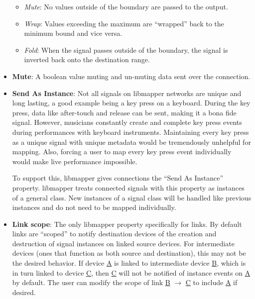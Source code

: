 \begin{itemize}
\begin{itemize}
		\item\emph{Mute}: No values outside of the boundary are passed to the output.
		\item\emph{Wrap}: Values exceeding the maximum are ``wrapped'' back to the minimum bound and vice versa.
		\item\emph{Fold}: When the signal passes outside of the boundary, the signal is inverted back onto the destination range. 
	\end{itemize}
	\item\textbf{Mute}: A boolean value muting and un-muting data sent over the connection.
	\item\textbf{Send As Instance}: Not all signals on libmapper networks are unique and long lasting, a good example being a key press on a keyboard. During the key press, data like after-touch and release can be sent, making it a bona fide signal. However, musicians constantly create and complete key press events during performances with keyboard instruments. Maintaining every key press as a unique signal with unique metadata would be tremendously unhelpful for mapping. Also, forcing a user to map every key press event individually would make live performance impossible.

	To support this, libmapper gives connections the ``Send As Instance'' property. libmapper treats connected signals with this property as instances of a general class. New instances of a signal class will be handled like previous instances and do not need to be mapped individually.
	\item\textbf{Link scope}: The only libmapper property specifically for links. By default links are ``scoped'' to notify destination devices of the creation and destruction of signal instances on linked source devices. For intermediate devices (ones that function as both source and destination), this may not be the desired behavior. If device \url{A} is linked to intermediate device \url{B}, which is in turn linked to device \url{C}, then \url{C} will not be notified of instance events on \url{A} by default. The user can modify the scope of link \url{B} $\rightarrow$ \url{C} to include \url{A} if desired.

\end{itemize}


